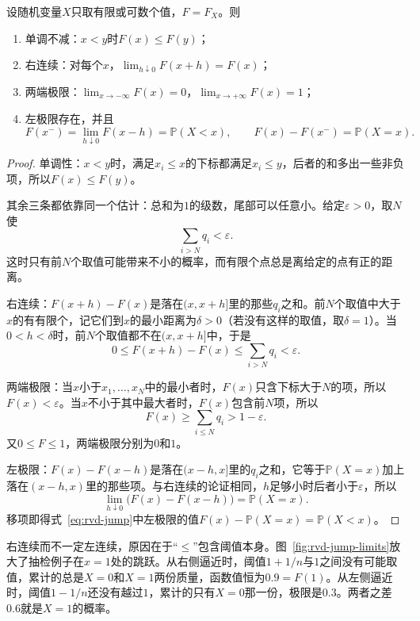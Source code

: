 \begin{theorem}[分布函数的性质]
\label{thm:rvd-cdf-properties}
设随机变量$X$只取有限或可数个值，$F=F_X$。则
\begin{enumerate}
  \item 单调不减：$x<y$时$F(x)\leq F(y)$；
  \item 右连续：对每个$x$，$\lim_{h\downarrow0}F(x+h)=F(x)$；
  \item 两端极限：$\lim_{x\to-\infty}F(x)=0$，$\lim_{x\to+\infty}F(x)=1$；
  \item 左极限存在，并且
  \begin{equation}
    F(x^{-})=\lim_{h\downarrow0}F(x-h)=\mathbb{P}(X<x),\qquad F(x)-F(x^{-})=\mathbb{P}(X=x).
    \label{eq:rvd-jump}
  \end{equation}
\end{enumerate}
\end{theorem}

\begin{proof}
单调性：$x<y$时，满足$x_i\leq x$的下标都满足$x_i\leq y$，后者的和多出一些非负项，所以$F(x)\leq F(y)$。

其余三条都依靠同一个估计：总和为$1$的级数，尾部可以任意小。给定$\varepsilon>0$，取$N$使
\[
  \sum_{i>N}q_i<\varepsilon .
\]
这时只有前$N$个取值可能带来不小的概率，而有限个点总是离给定的点有正的距离。

右连续：$F(x+h)-F(x)$是落在$(x,x+h]$里的那些$q_i$之和。前$N$个取值中大于$x$的有有限个，记它们到$x$的最小距离为$\delta>0$（若没有这样的取值，取$\delta=1$）。当$0<h<\delta$时，前$N$个取值都不在$(x,x+h]$中，于是
\[
  0\leq F(x+h)-F(x)\leq\sum_{i>N}q_i<\varepsilon .
\]

两端极限：当$x$小于$x_1,\dots,x_N$中的最小者时，$F(x)$只含下标大于$N$的项，所以$F(x)<\varepsilon$。当$x$不小于其中最大者时，$F(x)$包含前$N$项，所以
\[
  F(x)\geq\sum_{i\leq N}q_i>1-\varepsilon .
\]
又$0\leq F\leq1$，两端极限分别为$0$和$1$。

左极限：$F(x)-F(x-h)$是落在$(x-h,x]$里的$q_i$之和，它等于$\mathbb{P}(X=x)$加上落在$(x-h,x)$里的那些项。与右连续的论证相同，$h$足够小时后者小于$\varepsilon$，所以
\[
  \lim_{h\downarrow0}\bigl(F(x)-F(x-h)\bigr)=\mathbb{P}(X=x).
\]
移项即得式~\eqref{eq:rvd-jump}中左极限的值$F(x)-\mathbb{P}(X=x)=\mathbb{P}(X<x)$。
\end{proof}

右连续而不一定左连续，原因在于“$\leq$”包含阈值本身。图~\ref{fig:rvd-jump-limits}放大了抽检例子在$x=1$处的跳跃。从右侧逼近时，阈值$1+1/n$与$1$之间没有可能取值，累计的总是$X=0$和$X=1$两份质量，函数值恒为$0.9=F(1)$。从左侧逼近时，阈值$1-1/n$还没有越过$1$，累计的只有$X=0$那一份，极限是$0.3$。两者之差$0.6$就是$X=1$的概率。

